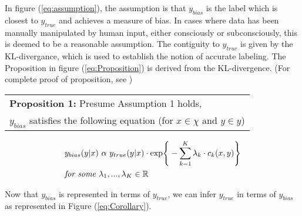 \bigskip
In figure (\ref{eq:assumption}), the assumption is that $y_{bias}$ is the label which is closest to $y_{true}$ and achieves a measure of bias.
In cases where data has been manually manipulated by human input, either consciously or subconsciously, this is deemed to be a reasonable assumption.
The contiguity to $y_{true}$ is given by the KL-divergance, which is used to establish the notion of accurate labeling. 
The Proposition in figure (\ref{eq:Proposition}) is derived from the KL-divergence. (For complete proof of proposition, see \cite{Jiang})
\enlargethispage{-2\baselineskip}

\bigskip
\begin{center}
    \begin{tabular}{l}
        \textbf{Proposition 1: } Presume Assumption 1 holds, \\
        $y_{bias}$ satisfies the following equation (for $x \in \chi \text{ and } y \in y$) \\
    \end{tabular}

    \begin{equation}
        \label{eq:Proposition}
        \begin{split}
            & y_{bias}(y|x) \text{ }\alpha \text{ } y_{true}(y|x) \cdot \text{exp} \Bigg\{ -\sum^K_{k=1} \lambda_k \cdot c_k(x,y)\Bigg\} \\
            & \textit{for some } \lambda_1, ..., \lambda_K \in \mathbb{R}
        \end{split}
    \end{equation}
\end{center}

\bigskip
Now that $y_{bias}$ is represented in terms of $y_{true}$, we can infer $y_{true}$ in terms of $y_{bias}$ as represented in Figure (\ref{eq:Corollary}).


